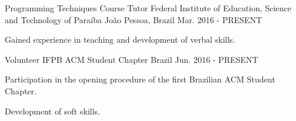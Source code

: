 \begin{cventries}
  \cventry
    {Programming Techniques Course Tutor} %
    {Federal Institute of Education, Science and Technology of Paraíba} %
    {João Pessoa, Brazil} %
    {Mar. 2016 - PRESENT} %
    {
      \begin{cvitems} %
        \item {Gained experience in teaching and development of verbal skills.}
      \end{cvitems}
    }

  \cventry
    {Volunteer} %
    {IFPB ACM Student Chapter} %
    {Brazil} %
    {Jun. 2016 - PRESENT} %
    {
      \begin{cvitems} %
        \item {Participation in the opening procedure of  the first Brazilian ACM Student Chapter.}
        \item {Development of soft skills.}
      \end{cvitems}
    }

\end{cventries}

